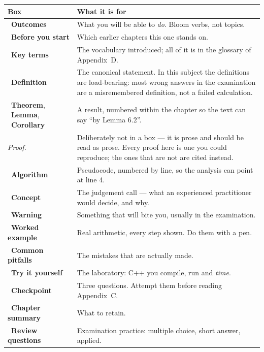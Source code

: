 \begin{longtable}{@{}L{4.6cm}L{10.6cm}@{}}
\toprule
{}
\textbf{Box} & \textbf{What it is for} \\
\midrule
\endhead
{}~\textbf{Outcomes} & What you will be able to \emph{do}. Bloom
verbs, not topics. \\
~\textbf{Before you start} & Which earlier chapters this one stands
on. \\
~\textbf{Key terms} & The vocabulary introduced; all of it is in
the glossary of Appendix~D. \\
~\textbf{Definition} & The canonical statement. In this subject the
definitions are load-bearing: most wrong answers in the examination are a
misremembered definition, not a failed calculation. \\
~\textbf{Theorem}, ~\textbf{Lemma},
~\textbf{Corollary} & A result, numbered within the
chapter so the text can say ``by Lemma 6.2''. \\
\emph{Proof.} & Deliberately not in a box --- it is prose and should be read as
prose. Every proof here is one you could reproduce; the ones that are not are
cited instead. \\
~\textbf{Algorithm} & Pseudocode, numbered by line, so the
analysis can point at line 4. \\
~\textbf{Concept} & The judgement call --- what an experienced
practitioner would decide, and why. \\
~\textbf{Warning} & Something that will bite you,
usually in the examination. \\
~\textbf{Worked example} & Real arithmetic, every step shown.
Do them with a pen. \\
~\textbf{Common pitfalls} & The mistakes that are
actually made. \\
~\textbf{Try it yourself} & The laboratory: C++ you compile, run
and \emph{time}. \\
~\textbf{Checkpoint} & Three questions. Attempt them
before reading Appendix~C. \\
~\textbf{Chapter summary} & What to retain. \\
~\textbf{Review questions} & Examination practice: multiple
choice, short answer, applied. \\
\bottomrule
\end{longtable}

